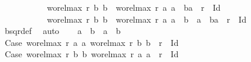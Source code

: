 \begin{isabellebody}
\ \ \ \ \ \ \ \ \ \ \ wo{\isacharunderscore}{\kern0pt}rel{\isachardot}{\kern0pt}max{}\ r\ b{}\ b{}\ {\isacharequal}{\kern0pt}\ wo{\isacharunderscore}{\kern0pt}rel{\isachardot}{\kern0pt}max{}\ r\ a{}\ a{}\ {\isasymand}\ {\isacharparenleft}{\kern0pt}b{}{\isacharcomma}{\kern0pt}a{}{\isacharparenright}{\kern0pt}\ {\isasymin}\ r\ {\isacharminus}{\kern0pt}\ Id\ {\isasymor}\isanewline
\ \ \ \ \ \ \ \ \ \ \ wo{\isacharunderscore}{\kern0pt}rel{\isachardot}{\kern0pt}max{}\ r\ b{}\ b{}\ {\isacharequal}{\kern0pt}\ wo{\isacharunderscore}{\kern0pt}rel{\isachardot}{\kern0pt}max{}\ r\ a{}\ a{}\ {\isasymand}\ b{}\ {\isacharequal}{\kern0pt}\ a{}\ {\isasymand}\ {\isacharparenleft}{\kern0pt}b{}{\isacharcomma}{\kern0pt}a{}{\isacharparenright}{\kern0pt}\ {\isasymin}\ r\ {\isacharminus}{\kern0pt}\ Id{\isachardoublequoteclose}\isanewline
\ \ \isamarkupfalse%
\ {\isacharasterisk}{\kern0pt}{\isacharasterisk}{\kern0pt}\ \isamarkupfalse%
\ bsqr{\isacharunderscore}{\kern0pt}def\ \isamarkupfalse%
\ auto\isanewline
\ \ \isamarkupfalse%
\ {\isachardoublequoteopen}a{}\ {\isacharequal}{\kern0pt}\ b{}\ {\isasymand}\ a{}\ {\isacharequal}{\kern0pt}\ b{}{\isachardoublequoteclose}\isanewline
\ \ \isamarkupfalse%
{\isacharminus}{\kern0pt}\isanewline
\ \ \ \ \isacommand{{\isacharbraceleft}{\kern0pt}}\isamarkupfalse%
\isamarkupfalse%
\ Case{}{\isacharcolon}{\kern0pt}\ {\isachardoublequoteopen}{\isacharparenleft}{\kern0pt}wo{\isacharunderscore}{\kern0pt}rel{\isachardot}{\kern0pt}max{}\ r\ a{}\ a{}{\isacharcomma}{\kern0pt}\ wo{\isacharunderscore}{\kern0pt}rel{\isachardot}{\kern0pt}max{}\ r\ b{}\ b{}{\isacharparenright}{\kern0pt}\ {\isasymin}\ r\ {\isacharminus}{\kern0pt}\ Id{\isachardoublequoteclose}\isanewline
\ \ \ \ \ \isacommand{{\isacharbraceleft}{\kern0pt}}\isamarkupfalse%
\isamarkupfalse%
\ Case{}{}{\isacharcolon}{\kern0pt}\ {\isachardoublequoteopen}{\isacharparenleft}{\kern0pt}wo{\isacharunderscore}{\kern0pt}rel{\isachardot}{\kern0pt}max{}\ r\ b{}\ b{}{\isacharcomma}{\kern0pt}\ wo{\isacharunderscore}{\kern0pt}rel{\isachardot}{\kern0pt}max{}\ r\ a{}\ a{}{\isacharparenright}{\kern0pt}\ {\isasymin}\ r\ {\isacharminus}{\kern0pt}\ Id{\isachardoublequoteclose}\isanewline

\end{isabellebody}
